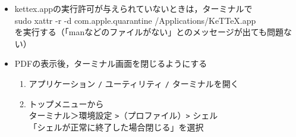 \documentclass{ujarticle}
\begin{document}
\begin{enumerate}[\bf\large 1.]
\begin{itemize}
\item kettex.appの実行許可が与えられていないときは，ターミナルで\\
\hspace*{5mm}sudo xattr -r -d com.apple.quarantine    /Applications/KeTTeX.app\\
を実行する（「manなどのファイルがない」とのメッセージが出ても問題ない）
%
    \item PDFの表示後，ターミナル画面を閉じるようにする
       \begin{enumerate}[(1)]
        \item アプリケーション \verb|/| ユーティリティ \verb|/| ターミナルを開く
        \item トップメニューから\\
          \hspace*{5mm}ターミナル＞環境設定 \verb|>|（プロファイル）\verb|>| シェル\\
          \hspace*{10mm}「シェルが正常に終了した場合閉じる」を選択
        \end{enumerate}
\end{itemize}

\end{enumerate}
\end{document}
